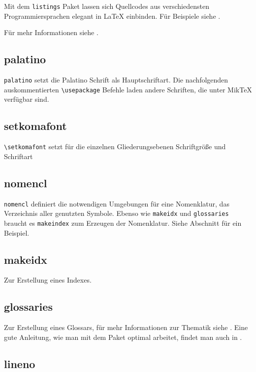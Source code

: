 Mit dem \texttt{listings} Paket lassen sich Quellcodes aus verschiedensten Programmiersprachen elegant in \LaTeX{} einbinden. Für Beispiele siehe .

Für mehr Informationen siehe \cite{listings}.


\subsection{palatino}

\texttt{palatino} setzt die Palatino Schrift als Hauptschriftart. Die nachfolgenden auskommentierten \verb|\usepackage| Befehle laden andere Schriften, die unter Mik\TeX{} verfügbar sind.

\subsection{setkomafont} 

\verb|\setkomafont| setzt für die einzelnen Gliederungsebenen Schriftgröße und Schriftart

\subsection{nomencl}

\texttt{nomencl} definiert die notwendigen Umgebungen für eine Nomenklatur, das Verzeichnis aller genutzten Symbole. Ebenso wie \texttt{makeidx} und \texttt{glossaries} braucht es \texttt{makeindex} zum Erzeugen der Nomenklatur. Siehe Abschnitt  für ein Beispiel.

\subsection{makeidx}

Zur Erstellung eines Indexes.

\subsection{glossaries}

Zur Erstellung eines Glossars, für mehr Informationen zur Thematik siehe \cite{glossaries}. Eine gute Anleitung, wie man mit dem Paket optimal arbeitet, findet man auch in \cite{tut:glossaries}.


\subsection{lineno}

